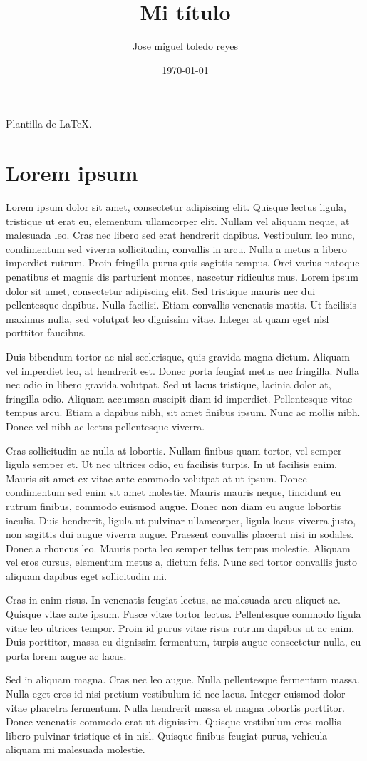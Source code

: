 \documentclass{article}
\author{Jose miguel toledo reyes \tanhks{josemiguel@ciencias.unam.mx}}
\title{Mi título}
\date{\today}
\begin{document}
\maketitle

Plantilla de \LaTeX.

\section{Lorem ipsum}

Lorem ipsum dolor sit amet, consectetur adipiscing elit. Quisque lectus ligula,
tristique ut erat eu, elementum ullamcorper elit. Nullam vel aliquam neque, at
malesuada leo. Cras nec libero sed erat hendrerit dapibus. Vestibulum leo nunc,
condimentum sed viverra sollicitudin, convallis in arcu. Nulla a metus a libero
imperdiet rutrum. Proin fringilla purus quis sagittis tempus. Orci varius
natoque penatibus et magnis dis parturient montes, nascetur ridiculus mus. Lorem
ipsum dolor sit amet, consectetur adipiscing elit. Sed tristique mauris nec dui
pellentesque dapibus. Nulla facilisi. Etiam convallis venenatis mattis. Ut
facilisis maximus nulla, sed volutpat leo dignissim vitae. Integer at quam eget
nisl porttitor faucibus.

Duis bibendum tortor ac nisl scelerisque, quis gravida magna dictum. Aliquam vel
imperdiet leo, at hendrerit est. Donec porta feugiat metus nec fringilla. Nulla
nec odio in libero gravida volutpat. Sed ut lacus tristique, lacinia dolor at,
fringilla odio. Aliquam accumsan suscipit diam id imperdiet. Pellentesque vitae
tempus arcu. Etiam a dapibus nibh, sit amet finibus ipsum. Nunc ac mollis
nibh. Donec vel nibh ac lectus pellentesque viverra.

Cras sollicitudin ac nulla at lobortis. Nullam finibus quam tortor, vel semper
ligula semper et. Ut nec ultrices odio, eu facilisis turpis. In ut facilisis
enim. Mauris sit amet ex vitae ante commodo volutpat at ut ipsum. Donec
condimentum sed enim sit amet molestie. Mauris mauris neque, tincidunt eu rutrum
finibus, commodo euismod augue. Donec non diam eu augue lobortis iaculis. Duis
hendrerit, ligula ut pulvinar ullamcorper, ligula lacus viverra justo, non
sagittis dui augue viverra augue. Praesent convallis placerat nisi in
sodales. Donec a rhoncus leo. Mauris porta leo semper tellus tempus
molestie. Aliquam vel eros cursus, elementum metus a, dictum felis. Nunc sed
tortor convallis justo aliquam dapibus eget sollicitudin mi.

Cras in enim risus. In venenatis feugiat lectus, ac malesuada arcu aliquet
ac. Quisque vitae ante ipsum. Fusce vitae tortor lectus. Pellentesque commodo
ligula vitae leo ultrices tempor. Proin id purus vitae risus rutrum dapibus ut
ac enim. Duis porttitor, massa eu dignissim fermentum, turpis augue consectetur
nulla, eu porta lorem augue ac lacus.

Sed in aliquam magna. Cras nec leo augue. Nulla pellentesque fermentum
massa. Nulla eget eros id nisi pretium vestibulum id nec lacus. Integer euismod
dolor vitae pharetra fermentum. Nulla hendrerit massa et magna lobortis
porttitor. Donec venenatis commodo erat ut dignissim. Quisque vestibulum eros
mollis libero pulvinar tristique et in nisl. Quisque finibus feugiat purus,
vehicula aliquam mi malesuada molestie.
\end{document}

